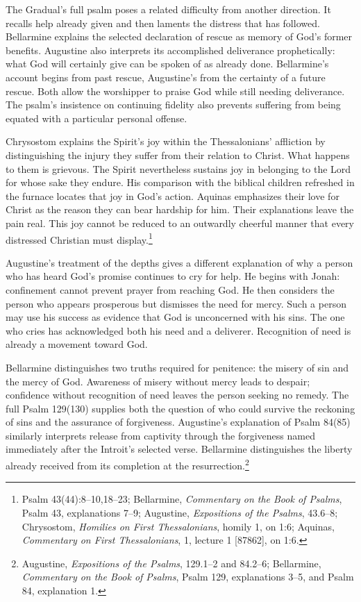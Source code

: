 The Gradual's full psalm poses a related difficulty from another direction. It recalls help already given and then laments the distress that has followed. Bellarmine explains the selected declaration of rescue as memory of God's former benefits. Augustine also interprets its accomplished deliverance prophetically: what God will certainly give can be spoken of as already done. Bellarmine's account begins from past rescue, Augustine's from the certainty of a future rescue. Both allow the worshipper to praise God while still needing deliverance. The psalm's insistence on continuing fidelity also prevents suffering from being equated with a particular personal offense.

Chrysostom explains the Spirit's joy within the Thessalonians' affliction by distinguishing the injury they suffer from their relation to Christ. What happens to them is grievous. The Spirit nevertheless sustains joy in belonging to the Lord for whose sake they endure. His comparison with the biblical children refreshed in the furnace locates that joy in God's action. Aquinas emphasizes their love for Christ as the reason they can bear hardship for him. Their explanations leave the pain real. This joy cannot be reduced to an outwardly cheerful manner that every distressed Christian must display.\footnote{Psalm 43(44):8--10,18--23; Bellarmine, \textit{Commentary on the Book of Psalms}, Psalm 43, explanations 7--9; Augustine, \textit{Expositions of the Psalms}, 43.6--8; Chrysostom, \textit{Homilies on First Thessalonians}, homily 1, on 1:6; Aquinas, \textit{Commentary on First Thessalonians}, 1, lecture 1 [87862], on 1:6.}

Augustine's treatment of the depths gives a different explanation of why a person who has heard God's promise continues to cry for help. He begins with Jonah: confinement cannot prevent prayer from reaching God. He then considers the person who appears prosperous but dismisses the need for mercy. Such a person may use his success as evidence that God is unconcerned with his sins. The one who cries has acknowledged both his need and a deliverer. Recognition of need is already a movement toward God.

Bellarmine distinguishes two truths required for penitence: the misery of sin and the mercy of God. Awareness of misery without mercy leads to despair; confidence without recognition of need leaves the person seeking no remedy. The full Psalm 129(130) supplies both the question of who could survive the reckoning of sins and the assurance of forgiveness. Augustine's explanation of Psalm 84(85) similarly interprets release from captivity through the forgiveness named immediately after the Introit's selected verse. Bellarmine distinguishes the liberty already received from its completion at the resurrection.\footnote{Augustine, \textit{Expositions of the Psalms}, 129.1--2 and 84.2--6; Bellarmine, \textit{Commentary on the Book of Psalms}, Psalm 129, explanations 3--5, and Psalm 84, explanation 1.}

